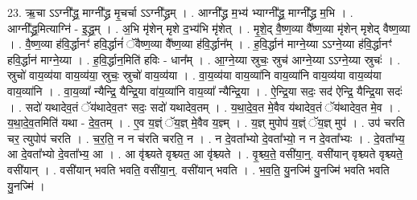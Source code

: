 \documentclass[17pt]{extarticle}
\begin{document}
23. ऋ॒चा ऽऽग्नी᳚द्ध्र॒ माग्नी᳚द्ध्र मृ॒चर्चा ऽऽग्नी᳚द्ध्रम् । . आग्नी᳚द्ध्र म॒भ्य॑ भ्याग्नी᳚द्ध्र॒ माग्नी᳚द्ध्र म॒भि । . आग्नी᳚द्ध्र॒मित्याग्नि॑ - इ॒द्ध्र॒म् । . अ॒भि मृ॑शेन् मृशे द॒भ्य॑भि मृ॑शेत् । . मृ॒शे॒द् वै॒ष्ण॒व्या वै᳚ष्ण॒व्या मृ॑शेन् मृशेद् वैष्ण॒व्या । . वै॒ष्ण॒व्या ह॑वि॒र्द्धानꣳ॑ हवि॒र्द्धानं॑ ॅवैष्ण॒व्या वै᳚ष्ण॒व्या ह॑वि॒र्द्धान᳚म् । . ह॒वि॒र्द्धान॑ माग्ने॒य्या ऽऽग्ने॒य्या ह॑वि॒र्द्धानꣳ॑ हवि॒र्द्धान॑ माग्ने॒य्या । . ह॒वि॒र्द्धान॒मिति॑ हविः - धान᳚म् । . आ॒ग्ने॒य्या स्रुचः॒ स्रुच॑ आग्ने॒य्या ऽऽग्ने॒य्या स्रुचः॑ । . स्रुचो॑ वाय॒व्य॑या वाय॒व्य॑या॒ स्रुचः॒ स्रुचो॑ वाय॒व्य॑या । . वा॒य॒व्य॑या वाय॒व्या॑नि वाय॒व्या॑नि वाय॒व्य॑या वाय॒व्य॑या वाय॒व्या॑नि । . वा॒य॒व्या᳚ न्यैन्द्रि॒ यैन्द्रि॒या वा॑य॒व्या॑नि वाय॒व्या᳚ न्यैन्द्रि॒या । . ऐ॒न्द्रि॒या सदः॒ सद॑ ऐन्द्रि॒ यैन्द्रि॒या सदः॑ । . सदो॑ यथादेव॒तं ॅय॑थादेव॒तꣳ सदः॒ सदो॑ यथादेव॒तम् । . य॒था॒दे॒व॒त मे॒वैव य॑थादेव॒तं ॅय॑थादेव॒त मे॒व । . य॒था॒दे॒व॒तमिति॑ यथा - दे॒व॒तम् । . ए॒व य॒ज्ञ्ं ॅय॒ज्ञ् मे॒वैव य॒ज्ञ्म् । . य॒ज्ञ् मुपोप॑ य॒ज्ञ्ं ॅय॒ज्ञ् मुप॑ । . उप॑ चरति चर॒ त्युपोप॑ चरति । . च॒र॒ति॒ न न च॑रति चरति॒ न । . न दे॒वता᳚भ्यो दे॒वता᳚भ्यो॒ न न दे॒वता᳚भ्यः । . दे॒वता᳚भ्य॒ आ दे॒वता᳚भ्यो दे॒वता᳚भ्य॒ आ । . आ वृ॑श्च्यते वृश्च्यत॒ आ वृ॑श्च्यते । . वृ॒श्च्य॒ते॒ वसी॑या॒न्॒. वसी॑यान् वृश्च्यते वृश्च्यते॒ वसी॑यान् । . वसी॑यान् भवति भवति॒ वसी॑या॒न्॒. वसी॑यान् भवति । . भ॒व॒ति॒ यु॒नज्मि॑ यु॒नज्मि॑ भवति भवति यु॒नज्मि॑ । \newline
\end{document}
